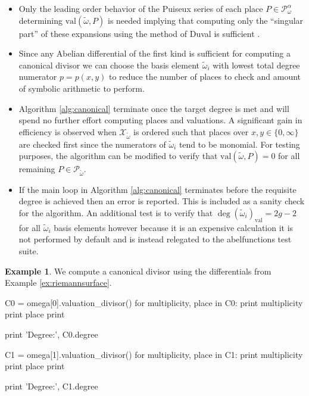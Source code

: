 \documentclass[12pt]{article}
\theoremstyle{definition}
\newtheorem{example}[theorem]{Example}
\begin{document}
\begin{itemize}
\item Only the leading order behavior of the Puiseux series of each
  place $P \in \mathcal{P}_\omega^\alpha$ determining
  $\text{val}(\tilde{\omega},P)$ is needed implying that computing only
  the ``singular part'' of these expansions using the method of Duval is
  sufficient \cite{Duval89}.
\item Since any Abelian differential of the first kind is sufficient for
  computing a canonical divisor we can choose the basis element
  $\tilde{\omega}_i$ with lowest total degree numerator $p=p(x,y)$ to
  reduce the number of places to check and amount of symbolic arithmetic
  to perform.
\item Algorithm \ref{alg:canonical} terminate once the target degree is
  met and will spend no further effort computing places and
  valuations. A significant gain in efficiency is observed when
  $\mathcal{X}_{\tilde{\omega}}$ is ordered such that places over $x,y
  \in \{0,\infty\}$ are checked first since the numerators of
  $\tilde{\omega}_i$ tend to be monomial. For testing purposes, the
  algorithm can be modified to verify that $\text{val}(\tilde{\omega},P)
  = 0$ for all remaining $P \in \mathcal{P}_{\tilde{\omega}}$.
\item If the main loop in Algorithm \ref{alg:canonical} terminates
  before the requisite degree is achieved then an error is
  reported. This is included as a sanity check for the algorithm. An
  additional test is to verify that $\deg (\tilde{\omega}_i)_\text{val}
  = 2g-2$ for all $\tilde{\omega}_i$ basis elements however because it
  is an expensive calculation it is not performed by default and is
  instead relegated to the {\sc abelfunctions} test suite.
\end{itemize}

\begin{example} \label{ex:canonical} %
We compute a canonical divisor using the differentials from Example
\ref{ex:riemannsurface}.
\begin{ipythoninput}
C0 = omega[0].valuation_divisor()
for multiplicity, place in C0:
    print multiplicity
    print place
    print

print 'Degree:', C0.degree
\end{ipythoninput}
\begin{ipythonoutput}
[XXX]
\end{ipythonoutput}
\begin{ipythoninput}
C1 = omega[1].valuation_divisor()
for multiplicity, place in C1:
    print multiplicity
    print place
    print

print 'Degree:', C1.degree
\end{ipythoninput}
\begin{ipythonoutput}
[XXX]
\end{ipythonoutput}
\end{example}
\end{document}
